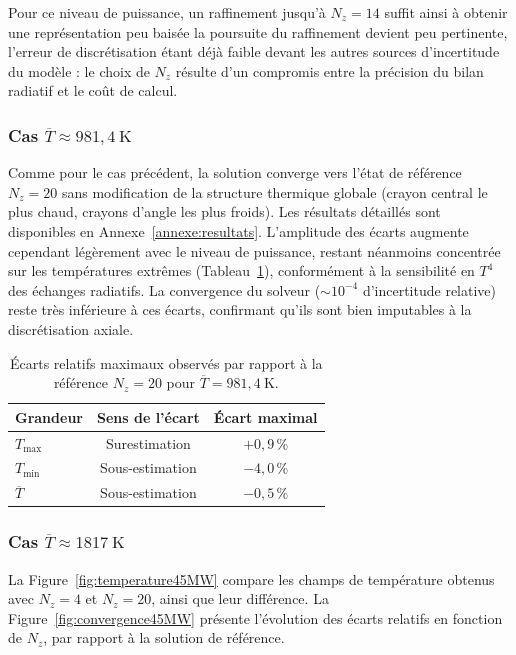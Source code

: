 Pour ce niveau de puissance, un raffinement jusqu'à $N_z=14$ suffit ainsi à obtenir une représentation peu baisée la poursuite du raffinement devient peu pertinente, l'erreur de discrétisation étant déjà faible devant les autres sources d'incertitude du modèle : le choix de $N_z$ résulte d'un compromis entre la précision du bilan radiatif et le coût de calcul.


\subsubsection{Cas $\overline{T} \approx 981{,}4~\mathrm{K}$}

Comme pour le cas précédent, la solution converge vers l'état de référence $N_z=20$ sans modification de la structure thermique globale (crayon central le plus chaud, crayons d'angle les plus froids). Les résultats détaillés sont disponibles en Annexe~\ref{annexe:resultats}. L'amplitude des écarts augmente cependant légèrement avec le niveau de puissance, restant néanmoins concentrée sur les températures extrêmes (Tableau~\ref{tab:ecarts_discretisation_axiale_4MW}), conformément à la sensibilité en $T^4$ des échanges radiatifs. La convergence du solveur ($\sim 10^{-4}$ d'incertitude relative) reste très inférieure à ces écarts, confirmant qu'ils sont bien imputables à la discrétisation axiale.

\begin{table}[H]
\centering
\caption{Écarts relatifs maximaux observés par rapport à la référence $N_z=20$ pour $\overline{T}=981{,}4~\mathrm{K}$.}
\label{tab:ecarts_discretisation_axiale_4MW}
\begin{tabular}{lcc}
\hline
Grandeur & Sens de l'écart & Écart maximal \\
\hline
$T_{\max}$ & Surestimation & $+0{,}9\,\%$ \\
$T_{\min}$ & Sous-estimation & $-4{,}0\,\%$ \\
$\overline{T}$ & Sous-estimation & $-0{,}5\,\%$ \\
\hline
\end{tabular}
\end{table}

\subsubsection{Cas $\overline{T} \approx 1817~\mathrm{K}$}

La Figure~\ref{fig:temperature45MW} compare les champs de température obtenus avec $N_z=4$ et $N_z=20$, ainsi que leur différence. La Figure~\ref{fig:convergence45MW} présente l'évolution des écarts relatifs en fonction de $N_z$, par rapport à la solution de référence.

